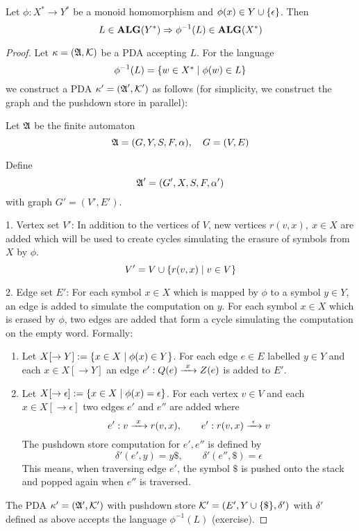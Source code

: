 \bigskip
\begin{theorem}
\label{alg-lang-closure-inv-hom}
Let $\phi : X^* \to Y^*$ be a monoid homomorphism and $\phi(x) \in Y \cup
\mbox{$\{\epsilon\}$}$. Then
\[ L \in \mbox{{\bf ALG}}(Y^*) \Rightarrow \phi^{-1}(L) \in \mbox{{\bf ALG}}(X^*) \]
\end{theorem}

\begin{proof}
Let $\kappa = (\mbox{$\mathfrak{A}$}, \mbox{$\mathcal{K}$})$ be a PDA accepting $L$. For the language
\[ \phi^{-1}(L) = \mbox{$\{w \in X^* \mid \phi(w) \in L\}$} \]
we construct a PDA $\kappa' = (\mbox{$\mathfrak{A}$}', \mbox{$\mathcal{K}$}')$ as follows (for
simplicity, we construct the graph and the pushdown store in parallel):

Let $\mbox{$\mathfrak{A}$}$ be the finite automaton
\[ \mbox{$\mathfrak{A}$} = (G, Y, S, F, \alpha),\quad G = (V, E) \]

Define
\[ \mbox{$\mathfrak{A}$}' = (G', X, S, F, \alpha') \]
with graph $G' = (V', E')$.

1. Vertex set $V'$: In addition to the vertices of $V$, new vertices $r(v, x),\
x \in X$ are added which will be used to create cycles simulating the erasure of
symbols from $X$ by $\phi$.
\[ V' = V \cup \mbox{$\{r(v,x) \mid v \in V\}$} \]

2. Edge set $E'$: For each symbol $x \in X$ which is mapped by $\phi$ to a 
symbol $y \in Y$, an edge is added to simulate the computation on $y$.
For each symbol $x \in X$ which is erased by $\phi$, two edges are added that
form a cycle simulating the computation on the empty word. Formally:

\begin{enumerate}
  \item Let $X[\to Y] := \mbox{$\{x \in X \mid \phi(x) \in Y\}$}$. For each edge
  $e \in E$ labelled $y \in Y$ and each $x \in X[\to Y]$ an edge $e': Q(e)
  \xrightarrow{\ {x}\ } Z(e)$ is added to $E'$.
  
  \item Let $X[\to \epsilon] := \mbox{$\{x \in X \mid \phi(x) = \epsilon\}$}$. For
  each vertex $v  \in V$ and each $x \in X[\to \epsilon]$ two edges $e'$ and
  $e''$ are added where
  \[ e': v \xrightarrow{\ {x}\ } r(v,x),\qquad e': r(v,x) \xrightarrow{\ {\epsilon}\ } v \]
  The pushdown store computation for $e', e''$ is defined by
  \[ \delta'(e', y) = y \$,\qquad \delta'(e'', \$) = \epsilon \]
  This means, when traversing edge $e'$, the symbol ${\$}$ is pushed onto the
  stack and popped again when $e''$ is traversed.
\end{enumerate}

The PDA $\kappa' = (\mbox{$\mathfrak{A'}$}, \mbox{$\mathcal{K'}$})$ with pushdown store
$\mbox{$\mathcal{K'}$} = (E', Y \cup \mbox{$\{\$\}$}, \delta')$ with $\delta'$ defined as
above accepts the language $\phi^{-1}(L)$ (exercise).
\end{proof}

